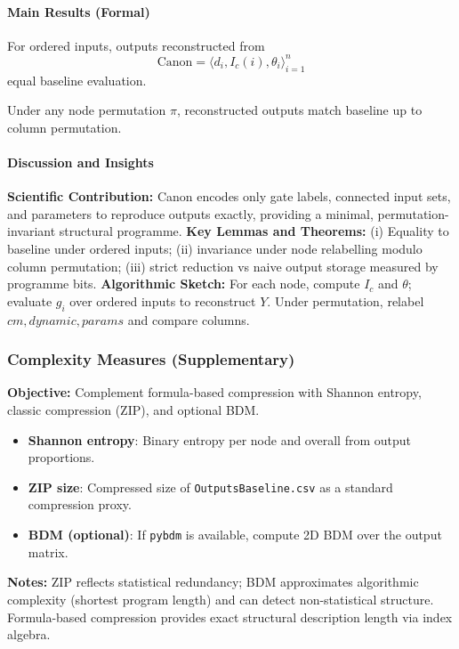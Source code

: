 \paragraph{Main Results (Formal)}
\begin{theorem}
For ordered inputs, outputs reconstructed from \[\mathrm{Canon}=\langle d_i, I_c(i), \theta_i\rangle_{i=1}^n\] equal baseline evaluation.
\end{theorem}
\begin{lemma}
Under any node permutation \(\pi\), reconstructed outputs match baseline up to column permutation.
\end{lemma}
\paragraph{Discussion and Insights}
\textbf{Scientific Contribution:} Canon encodes only gate labels, connected input sets, and parameters to reproduce outputs exactly, providing a minimal, permutation-invariant structural programme.
\textbf{Key Lemmas and Theorems:} (i) Equality to baseline under ordered inputs; (ii) invariance under node relabelling modulo column permutation; (iii) strict reduction vs naive output storage measured by programme bits.
\textbf{Algorithmic Sketch:} For each node, compute \(I_c\) and \(\theta\); evaluate \(g_i\) over ordered inputs to reconstruct \(Y\). Under permutation, relabel \(cm, dynamic, params\) and compare columns.

\subsubsection{Complexity Measures (Supplementary)}
\textbf{Objective:} Complement formula-based compression with Shannon entropy, classic compression (ZIP), and optional BDM.
\begin{itemize}
 \item \textbf{Shannon entropy}: Binary entropy per node and overall from output proportions.
 \item \textbf{ZIP size}: Compressed size of \texttt{OutputsBaseline.csv} as a standard compression proxy.
 \item \textbf{BDM (optional)}: If \texttt{pybdm} is available, compute 2D BDM over the output matrix.
\end{itemize}
\textbf{Notes:} ZIP reflects statistical redundancy; BDM approximates algorithmic complexity (shortest program length) and can detect non-statistical structure. Formula-based compression provides exact structural description length via index algebra.
